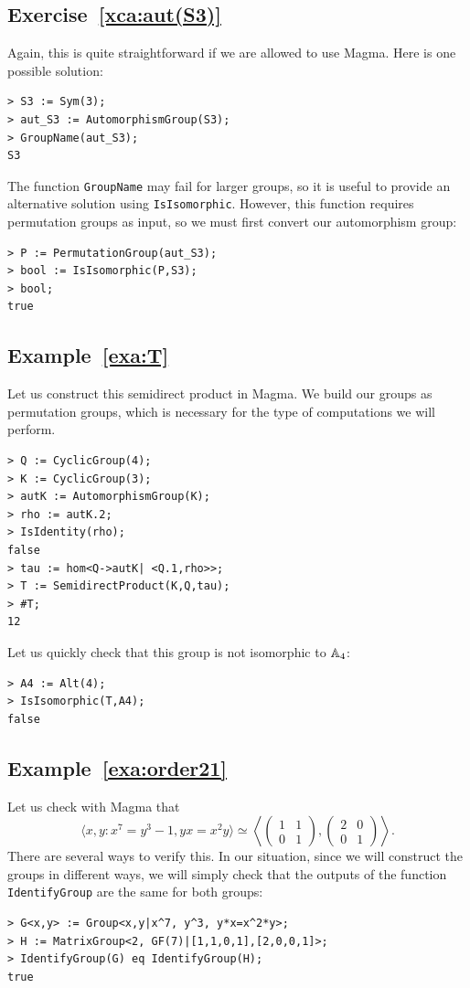 \subsection*{Exercise~\ref{xca:aut(S3)}}

Again, this is quite straightforward if we are allowed to use Magma. 
Here is one possible solution:
\begin{lstlisting}
> S3 := Sym(3);
> aut_S3 := AutomorphismGroup(S3);
> GroupName(aut_S3);
S3    
\end{lstlisting}
The function \lstinline{GroupName} may fail for larger groups, 
so it is useful to provide an alternative solution using \lstinline{IsIsomorphic}. 
However, this function requires permutation groups as input, 
so we must first convert our automorphism group:
\begin{lstlisting}
> P := PermutationGroup(aut_S3);
> bool := IsIsomorphic(P,S3);
> bool;
true   
\end{lstlisting}

\subsection*{Example~\ref{exa:T}}

Let us construct this semidirect product in Magma.
We build our groups as permutation groups, which is necessary 
for the type of computations we will perform.
\begin{lstlisting}
> Q := CyclicGroup(4);
> K := CyclicGroup(3);    
> autK := AutomorphismGroup(K);
> rho := autK.2;
> IsIdentity(rho);
false
> tau := hom<Q->autK| <Q.1,rho>>;
> T := SemidirectProduct(K,Q,tau);
> #T;
12
\end{lstlisting}
Let us quickly check that this group is not isomorphic to $\mathbb{A}_4$: 
\begin{lstlisting}
> A4 := Alt(4);
> IsIsomorphic(T,A4);
false
\end{lstlisting}

\subsection*{Example~\ref{exa:order21}}

Let us check with Magma that 
\[
\langle x,y:x^7=y^3-1,yx=x^2y\rangle\simeq\left\langle 
\begin{pmatrix}
    1&1\\
    0&1
\end{pmatrix},
\begin{pmatrix}
    2&0\\
    0&1
\end{pmatrix}\right\rangle.
\]
There are several ways to verify this. In our situation, since we will construct 
the groups in different ways, we will simply check 
that the outputs of the function \lstinline{IdentifyGroup} 
are the same for both groups:
\begin{lstlisting}
> G<x,y> := Group<x,y|x^7, y^3, y*x=x^2*y>;
> H := MatrixGroup<2, GF(7)|[1,1,0,1],[2,0,0,1]>;
> IdentifyGroup(G) eq IdentifyGroup(H);
true    
\end{lstlisting}


